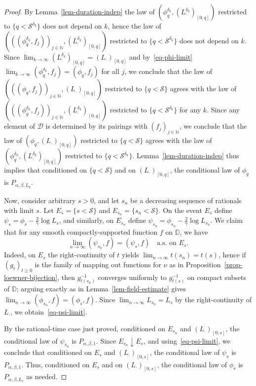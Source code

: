 \documentclass[a4paper]{article}
\numberwithin{equation}{section}
\newcommand{\eqb}{\begin{equation}}
\newcommand{\eqe}{\end{equation}}
\newcommand{\D}{\mathbb{D}}
\newcommand{\N}{\mathbb{N}}
\newcommand{\cD}{\mathcal{D}}
\newcommand{\qduration}{\mathcal{S}}
\theoremstyle{remark}
\numberwithin{equation}{section}
\begin{document}
\begin{proof}
By Lemma~\ref{lem-duration-indep} the law of $(\phi_q^{\delta_k}, (L_\cdot^{\delta_k})_{[0,q]})$ restricted to $\{q < \qduration^{\delta_k}\}$ does not depend on $k$, hence the law of $(((\phi_q^{\delta_k}, f_j))_{j \in \N},  (L_\cdot^{\delta_k})_{[0,q]})$ restricted to $\{q < \qduration^{\delta_k}\}$ does not depend on $k$. Since $\lim_{k\to\infty} (L_\cdot^{\delta_k})_{[0,q]} =(L_\cdot)_{[0,q]}$ and by~\eqref{eq-phi-limit} $\lim_{k \to \infty} (\phi_q^{\delta_k}, f_j) = (\phi_q, f_j)$ for all $j$, we conclude that the law of $(((\phi_q, f_j))_{j \in \N},  (L_\cdot)_{[0,q]})$ restricted to $\{q < \qduration\}$ agrees with the law of $(((\phi_q^{\delta_k}, f_j))_{j \in \N},  (L_\cdot^{\delta_k})_{[0,q]})$ restricted to $\{q < \qduration^{\delta_k}\}$ for any $k$. 
Since any element of $\cD$ is determined by its pairings with $(f_{j})_{j\in \N}$, we conclude that the law of $(\phi_q, (L_\cdot)_{[0,q]})$ restricted to $\{q < \qduration\}$ agrees with the law of $(\phi_q^{\delta_k}, (L_\cdot^{\delta_k})_{[0,q]})$ restricted to $\{ q < \qduration^{\delta_k}\}$. Lemma~\ref{lem-duration-indep} thus implies that conditioned on $\{q < \qduration\}$ and on $(L_\cdot)_{[0,q]}$, the conditional law of $\phi_q$ is $P_{\alpha, \beta, L_q}$.


Now, consider arbitrary $s>0$, and let $s_n$ be a decreasing sequence of rationals with limit $s$. Let $E_s = \{ s < \qduration\}$ and $E_{s_n} = \{ s_n < \qduration\}$. On the event $E_s$ define $\psi_s = \phi_s - \frac2\gamma \log L_s$, and similarly, on $E_{s_n}$ define $\psi_{s_n} = \phi_{s_n} - \frac2\gamma \log L_{s_n}$. We claim that for any smooth compactly-supported function $f$ on $\D$, we have 
\eqb\label{eq-psi-limit}
\lim_{n \to \infty} (\psi_{s_n}, f) = (\psi_s, f) \quad \text{a.s.\ on }E_s.
\eqe
Indeed, on $E_s$ the right-continuity of $t$ yields $\lim_{n \to \infty} t(s_n) = t(s)$, hence if $(g_t)_{t \geq 0}$ is the family of  mapping out functions for $\nu$ as in Proposition~\ref{prop-loewner-bijection}, then $g_{t(s_n)}^{-1}$ converges uniformly to $g_{t(s)}^{-1}$ on compact subsets of $\D$; arguing exactly as in Lemma~\ref{lem-field-estimate} gives $\lim_{n \to \infty} (\phi_{s_n}, f) = (\phi_s, f)$. Since $\lim_{n \to \infty} L_{s_n} = L_s$ by the right-continuity of $L_\cdot$, we obtain~\eqref{eq-psi-limit}.

By the rational-time case just proved, conditioned on $E_{s_n}$ and $(L_\cdot)_{[0,s]}$, the conditional law of $\psi_{s_n}$ is $P_{\alpha, \beta, 1}$. 
Since $E_{s_n} \downarrow E_s$, and using~\eqref{eq-psi-limit}, we conclude that conditioned on $E_s$ and $(L_\cdot)_{[0,s]}$, the conditional law of $\psi_{s}$ is $P_{\alpha, \beta, 1}$. Thus, conditioned on $E_s$ and on $(L_\cdot)_{[0,s]}$, the conditional law of $\phi_s$ is $P_{\alpha, \beta, L_s}$ as needed. 
\end{proof}
\end{document}

